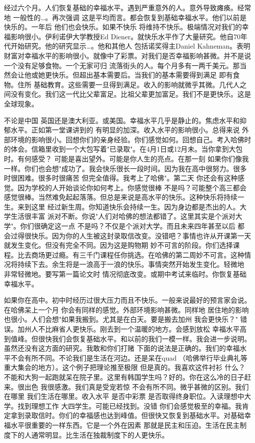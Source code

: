 经过六个月。人们恢复基础的幸福水平。遇到严重意外的人。意外导致瘫痪。经常地 一般性的…。再次强调 这是平均而言。都会恢复到基础幸福水平。他们以前是快乐的。一年后 他们也会快乐。如果不快乐 将维持不快乐。极端情况对我们的幸福影响很小。伊利诺伊大学教授Ed Diener。就快乐水平作了大量研究。他自70年代开始研究。他的研究显示…。他和其他人 包括诺奖得主Daniel Kahneman。表明财富对幸福水平的影响很小。就像中了彩票。对我们是否幸福影响甚微。并不是说一个没有足够食物。一个无家可归 流落街头的人。每个月多有一两千美元。那当然会让他或她更快乐。但超出基本需要后。当我们的基本需要得到满足 即有食物。住所 基础教育。这些需要一旦得到满足。收入的影响就微乎其微。几代人之间没有变化。我们这一代比父辈富足。比祖父辈更加富足。我们不是更快乐。这是全球现象。 

不论是中国 英国还是澳大利亚。或美国。幸福水平几乎是静止的。焦虑水平和抑郁水平。正如第一堂课讲到的 有明显的加深。收入水平的影响很小。总得来说 外部环境的影响很小。回想你们的亲身经验。你们感觉如何。回想自己。考入哈佛时的体会。信箱里收到一个大包写着"已录取"。在4月1日或12月未。当你拿到大包时。有何感受？ 可能是喜出望外。可能是你人生的亮点。在那一刻 如果你们像我一样。你们也会想"成功了。我会快乐很长一段时间。因为我在高中很努力。很多时很困难。很多时很痛苦 但完全值得。我考上了哈佛"。第二天 你还会有这种感觉。因为学校的人开始谈论你如何考上。你感觉很棒 不是吗？可能整个高三都会感觉很棒。当然难免起起落落。但总是来说是高水平的快乐。这种快乐将持续一生。来到这里 经过新生周。你知道快乐会持续一生。因为身边都是杰出的人。大学生活很丰富 派对不断。你说"人们对哈佛的想法都错了。这里其实是个派对大学"。你们很确定这一点 不是吗？不仅是个派对大学。而且未来四年甚至以后 都会过得很快乐。因为你的人生被这封录取信改变。没错吧？事情也许从开课第一天就发生变化。但没有完全不同。因为这是购物期 妙不可言的阶段。你们选择课程。比去商场更过瘾。有三千门课程任你挑选。在哈佛的第二周妙不可言。这种情况将持续下去。余生将是一浪高于一浪的快乐。事情突然开始发生变化。轻微地 非常轻微地。要写第一篇论文时 情况彻底改变。或期中考试来临时。你恢复基础幸福水平。 

如果你在高中。初中时经历过很大压力而且不快乐。一般来说最好的预言家会说。在哈佛呆上一个月 你会有同样的感觉。外部环境影响甚微。同样地 居住地的影响也很小。人们会想"如果我搬到。尤其是在白天。要是搬去加州 我会更快乐？" 错误。加州人不比麻省人更快乐。刚去到一个温暖的地方。会感到放松 幸福水平高到值峰。但很快我们会恢复基础水平。和以前的我们一模一样。我会进一步说明。虽然还没有这方面的研究。我敢和你们打赌 下面的说法是正确的。我们的幸福水平不会有所不同。不论我们是生活在河边。还是呆在quad （哈佛举行毕业典礼等重大集会的地方）。这个例子把理论推至极限 但是真的。我喜欢这件衬衫 什么？不能和大狗一起跑就呆在院子里。这里有韩国学生吗？好的。你在这么冷的日子赶来。很出色 我很感激。我们真是受宠若惊 不会有所不同。微乎甚微的区别。我们在哪里 我们生活在哪里。收入水平 是否中彩票 是否取得终身职位。入读理想中大学。找到理想工作 大四学生。可能已经找到。没错 你们会感觉极至的幸福。我肯定拿到录取信时。你们的幸福感也达到峰值。但很快又恢复到基础水平。对基础幸福水平很重要的一样东西。它是一个外在因素 那就是民主和压迫。生活在民主制度下的人通常明显。比生活在独裁制度下的人更快乐。 

